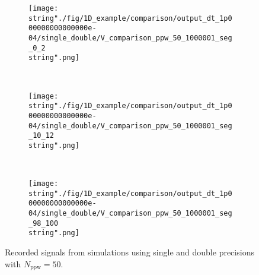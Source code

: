 
\hspace{-0.05\textwidth}
\begin{minipage}[t]{.5\textwidth}
%
\begin{figure}[H]
\captionsetup{width=0.95\textwidth,font=footnotesize,labelfont=footnotesize}
\centering
%
\begin{subfigure}[b]{1\textwidth}
%
\centering\texttt{[image: \\string"./fig/1D\_example/comparison/output\_dt\_1p000000000000000e-04/single\_double/V\_comparison\_ppw\_50\_1000001\_seg\_0\_2\\string".png]}
%
\end{subfigure}\hfill
\\[2ex]
%
\begin{subfigure}[b]{1\textwidth}
%
\centering\texttt{[image: \\string"./fig/1D\_example/comparison/output\_dt\_1p000000000000000e-04/single\_double/V\_comparison\_ppw\_50\_1000001\_seg\_10\_12\\string".png]}
%
\end{subfigure}\hfill
\\[2ex]
%
\begin{subfigure}[b]{1\textwidth}
%
\centering\texttt{[image: \\string"./fig/1D\_example/comparison/output\_dt\_1p000000000000000e-04/single\_double/V\_comparison\_ppw\_50\_1000001\_seg\_98\_100\\string".png]}
%
\end{subfigure}\hfill
%
\caption{Recorded signals from simulations using single and double precisions with $N_\text{ppw}=50$.}
\label{comparison_V_single_double_segments_ppw_50}
\end{figure}
%
\end{minipage}
%
\hfill %
%
